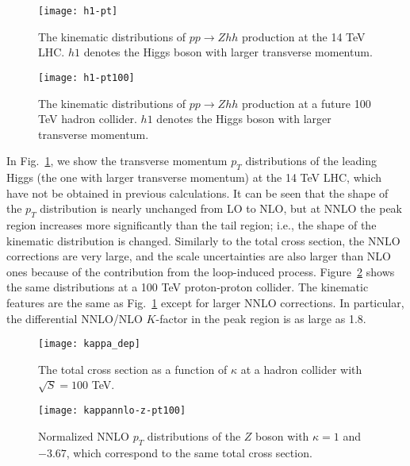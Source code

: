\documentclass[a4paper,amsmath,preprintnumbers,showpacs,twocolumn,prl,superscriptaddress, nofootinbib]{revtex4}
\begin{document}
\begin{figure}
    \texttt{[image: h1-pt]}
    \\
  \caption{The kinematic distributions of $pp\to Zhh$ production at the 14 TeV LHC.
  $h1$ denotes the Higgs boson with larger transverse momentum. }
  \label{fig:kin}
\end{figure}

\begin{figure}
    \texttt{[image: h1-pt100]}
\\
  \caption{The kinematic distributions of $pp\to Zhh$ production at a future 100 TeV hadron collider.
   $h1$ denotes the Higgs boson with larger transverse momentum.  }
  \label{fig:kin100}
\end{figure}



In Fig.~{\ref{fig:kin}}, we show the transverse momentum $p_T$ distributions of the leading Higgs (the one with larger transverse momentum) at the 14 TeV LHC, which have not be obtained in previous calculations. It can be seen that  the shape of the $p_T$ distribution is nearly unchanged from LO to NLO, 
but at NNLO the peak region increases more significantly than the tail region; i.e., 
the shape of the kinematic distribution is changed. Similarly to the total cross section, the NNLO corrections are very large, and  the scale uncertainties are also  larger than NLO ones because of the contribution from the loop-induced process. Figure~{\ref{fig:kin100}} shows the same distributions at a 100 TeV proton-proton collider. The kinematic features are the same as Fig.~\ref{fig:kin} except for larger NNLO corrections. 
 In particular,
the differential NNLO/NLO $K$-factor in the peak region is as large as 1.8.


\begin{figure}
  \texttt{[image: kappa\_dep]}
  \caption{ The total cross section as a function of $\kappa$ at a hadron collider with $\sqrt{S}=100$ TeV. }
  \label{fig:kappa_dep}
\end{figure}

\begin{figure}
  \texttt{[image: kappannlo-z-pt100]}
  \caption{ Normalized NNLO $p_T$ distributions of the $Z$ boson with $\kappa=1$ and $-3.67$, which correspond to the same total cross section. }
  \label{fig:kappa_dep_diff}
\end{figure}
\end{document}
